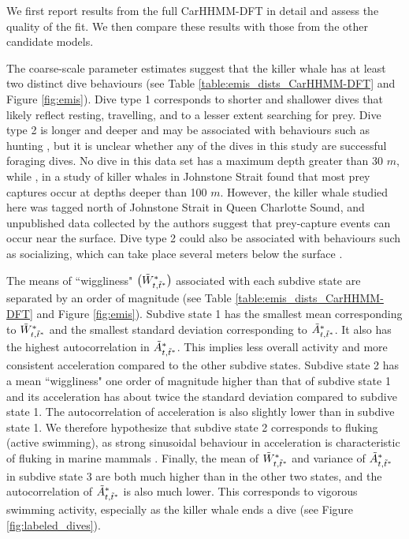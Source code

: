 We first report results from the full CarHHMM-DFT in detail and assess the quality of the fit. We then compare these results with those from the other candidate models.

The coarse-scale parameter estimates suggest that the killer whale has at least two distinct dive behaviours (see Table \ref{table:emis_dists_CarHHMM-DFT} and Figure \ref{fig:emis}). 
Dive type 1 corresponds to shorter and shallower dives that likely reflect resting, travelling, and to a lesser extent searching for prey.
Dive type 2 is longer and deeper and may be associated with behaviours such as hunting  \citep{Tennessen:2019b}, but it is unclear whether any of the dives in this study are successful foraging dives. No dive in this data set has a maximum depth greater than 30 $m$, while \citet{Wright:2017}, in a study of killer whales in Johnstone Strait found that most prey captures occur at depths deeper than 100 $m$. However, the killer whale studied here was tagged north of Johnstone Strait in Queen Charlotte Sound, and unpublished data collected by the authors suggest that prey-capture events can occur near the surface.
Dive type 2 could also be associated with behaviours such as socializing, which can take place several meters below the surface \citep{Tennessen:2019b}.

The means of ``wiggliness" $\big(\tilde{W}^*_{t,\tilde t^*}\big)$ associated with each subdive state are separated by an order of magnitude (see Table \ref{table:emis_dists_CarHHMM-DFT} and Figure \ref{fig:emis}). 
Subdive state 1 has the smallest mean corresponding to $\tilde{W}^*_{t,\tilde t^*}$ and the smallest standard deviation corresponding to $\tilde{A}^*_{t,\tilde t^*}$. It also has the highest autocorrelation in $\tilde{A}^*_{t,\tilde t^*}$. This implies less overall activity and more consistent acceleration compared to the other subdive states. 
Subdive state 2 has a mean ``wiggliness" one order of magnitude higher than that of subdive state 1 and its acceleration has about twice the standard deviation compared to subdive state 1. The autocorrelation of acceleration is also slightly lower than in subdive state 1. We therefore hypothesize that subdive state 2 corresponds to fluking (active swimming), as strong sinusoidal behaviour in acceleration is characteristic of fluking in marine mammals \citep{Simon:2012}.
Finally, the mean of $\tilde{W}^*_{t,\tilde t^*}$ and variance of $\tilde{A}^*_{t,\tilde t^*}$ in subdive state 3 are both much higher than in the other two states, and the autocorrelation of $\tilde{A}^*_{t,\tilde t^*}$ is also much lower. This corresponds to vigorous swimming activity, especially as the killer whale ends a dive (see Figure \ref{fig:labeled_dives}). 

